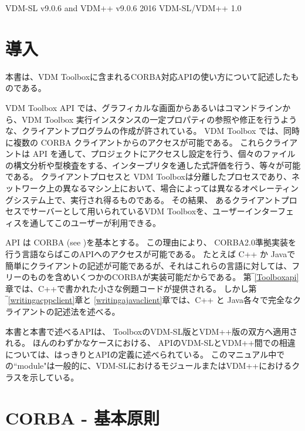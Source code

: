 \documentclass[\pformat,12pt]{jarticle}
\begin{document}
       {VDM-SL v9.0.6 and VDM++ v9.0.6}
       {2016}
       {VDM-SL/VDM++}
       {1.0}

\renewcommand{\thepage}{\roman{page}}

\label{endtofc}
\ifthenelse{\isodd{\pageref{endtofc}}}{\mbox{}\newpage}{}
\newpage 
\renewcommand{\thepage}{\arabic{page}}
\setcounter{page}{1}


\section{導入}
本書は、VDM Toolboxに含まれるCORBA対応APIの使い方について記述したものである。

VDM Toolbox API では、グラフィカルな画面からあるいはコマンドラインから、VDM Toolbox 実行インスタンスの一定プロパティの参照や修正を行うような、クライアントプログラムの作成が許されている。
 VDM Toolbox では、同時に複数の CORBA クライアントからのアクセスが可能である。
これらクライアントは API を通して、プロジェクトにアクセスし設定を行う、個々のファイルの構文分析や型検査をする、インタープリタを通した式評価を行う、等々が可能である。
クライアントプロセスと VDM Toolboxは分離したプロセスであり、ネットワーク上の異なるマシン上において、場合によっては異なるオペレーティングシステム上で、実行され得るものである。
その結果、 あるクライアントプロセスでサーバーとして用いられているVDM Toolboxを、ユーザーインターフェィスを通してこのユーザーが利用できる。

 API は CORBA (see \cite{OMG&96})を基本とする。
この理由により、 CORBA2.0準拠実装を行う言語ならばこのAPIへのアクセスが可能である。
たとえば C++ か Javaで簡単にクライアントの記述が可能であるが、それはこれらの言語に対しては、フリーのものを含めいくつかのCORBAが実装可能だからである。
第‾\ref{Toolboxapi}章では、C++で書かれた小さな例題コードが提供される。
しかし第‾\ref{writingacppclient}章と \ref{writingajavaclient}章では、C++ と Java各々で完全なクライアントの記述法を述べる。

本書と本書で述べるAPIは、 ToolboxのVDM-SL版とVDM++版の双方へ適用される。 
ほんのわずかなケースにおける、 APIのVDM-SLとVDM++間での相違については、はっきりとAPIの定義に述べられている。
このマニュアル中での``module"は一般的に、VDM-SLにおけるモジュールまたはVDM++におけるクラスを示している。

\newpage
\section{CORBA - 基本原則}
\end{document}
